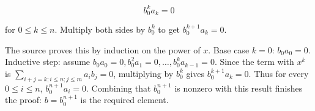 \[b_{0}^{k}a_{k} = 0\]

for \(0 \leq k \leq n\). Multiply both sides by \(b_{0}^{k}\) to get \(b_{0}^{k + 1}a_{k} = 0\).

The source proves this by induction on the power of \(x\). Base case \(k = 0\): \(b_{0}a_{0} = 0\). Inductive step: assume \(b_{0}a_{0} = 0,b_{0}^{2}a_{1} = 0,\ldots,b_{0}^{k}a_{k - 1} = 0\). Since the term with \(x^{k}\) is \(\sum_{i + j = k;i \leq n;j \leq m}a_{i}b_{j} = 0\), multiplying by \(b_{0}^{k}\) gives \(b_{0}^{k + 1}a_{k} = 0\). Thus for every \(0 \leq i \leq n\), \(b_{0}^{n + 1}a_{i} = 0\). Combining that \(b_{0}^{n + 1}\) is nonzero with this result finishes the proof: \(b = b_{0}^{n + 1}\) is the required element.
